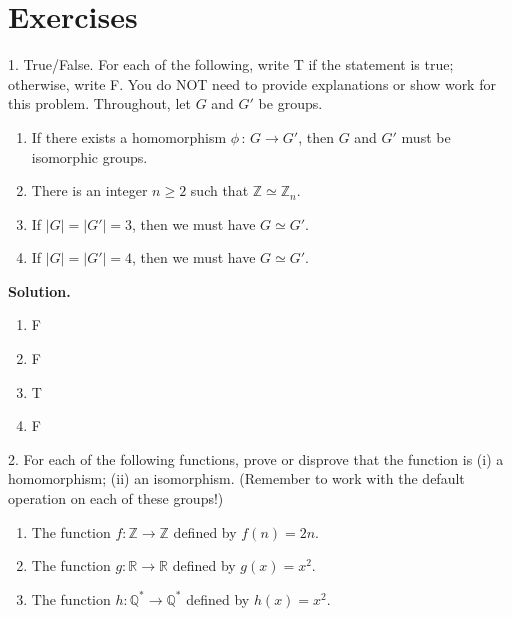 \documentclass[10pt,]{book}
\theoremstyle{plain}
\theoremstyle{definition}
\theoremstyle{definition}
\theoremstyle{definition}
\theoremstyle{definition}
\numberwithin{equation}{section}
\def\Z{\mathbb{Z}}
\def\R{\mathbb{R}}
\def\Q{\mathbb{Q}}
\begin{document}
\section[{Exercises}]{Exercises}\label{exercises-4}
\begin{exerciselist}
\item[1.]\hypertarget{exercise-21}{}True/False. For each of the following, write T if the statement is true; otherwise, write F. You do NOT need to provide explanations or show work for this problem. Throughout, let \(G\) and \(G'\) be groups. \leavevmode%
\begin{enumerate}[label=(\alph*)]
\item\hypertarget{li-157}{}If there exists a homomorphism \(\phi\,:\,G\to G'\), then \(G\) and \(G'\) must be isomorphic groups.%
\item\hypertarget{li-158}{}There is an integer \(n\geq 2\) such that \(\Z\simeq \Z_n\).%
\item\hypertarget{li-159}{}If \(|G|=|G'|=3\), then we must have \(G\simeq G'\).%
\item\hypertarget{li-160}{}If \(|G|=|G'|=4\), then we must have \(G\simeq G'\).%
\end{enumerate}
%
\par\smallskip
\par\smallskip
\noindent\textbf{Solution.}\hypertarget{solution-21}{}\quad
\leavevmode%
\begin{multicols}{4}
\begin{enumerate}[label=(\alph*)]
\item\hypertarget{li-161}{}F%
\item\hypertarget{li-162}{}F%
\item\hypertarget{li-163}{}T%
\item\hypertarget{li-164}{}F%
\end{enumerate}
\end{multicols}
\item[2.]\hypertarget{exercise-22}{}For each of the following functions, prove or disprove that the function is (i) a homomorphism; (ii) an isomorphism. (Remember to work with the default operation on each of these groups!) \leavevmode%
\begin{enumerate}[label=(\alph*)]
\item\hypertarget{li-165}{}The function \(f:\Z\to\Z\) defined by \(f(n)=2n\).%
\item\hypertarget{li-166}{}The function \(g:\R\to\R\) defined by \(g(x)=x^2\).%
\item\hypertarget{li-167}{}The function \(h:\Q^*\to\Q^*\) defined by \(h(x)=x^2\).%

\end{enumerate}
\end{exerciselist}
\end{document}
